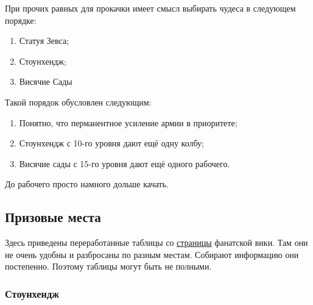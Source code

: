 При прочих равных для прокачки имеет смысл выбирать чудеса в следующем порядке:

\begin{enumerate}
    \item Статуя Зевса;
    \item Стоунхендж;
    \item Висячие Сады
\end{enumerate}

Такой порядок обусловлен следующим:

\begin{enumerate}
    \item Понятно, что перманентное усиление армии в приоритете;
    \item Стоунхендж с 10-го уровня дают ещё одну колбу;
    \item Висячие сады с 15-го уровня дают ещё одного рабочего.
\end{enumerate}

До рабочего просто намного дольше качать.


\subsection{Призовые места}

Здесь приведены переработанные таблицы со
\underline{\href{https://rise-of-cultures.fandom.com/wiki/World\_Wonders}{страницы}}
фанатской вики.
Там они не очень удобны и разбросаны по разным местам.
Собирают информацию они постепенно. Поэтому таблицы могут быть не полными.

\subsubsection{Стоунхендж}

